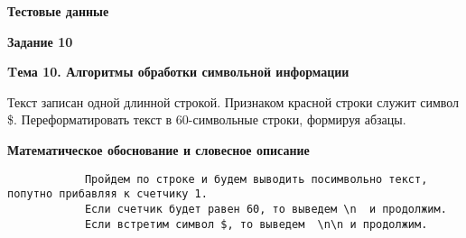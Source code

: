 \documentclass[12pt, a4paper]{article}
\begin{document}
		{\textbf{Тестовые данные}\par

		}


		\begin{flushleft}
			\newpage
			{\textbf{Задание 10}}\par
			{\textbf{Tема 10. Алгоритмы обработки символьной информации}}\par
			{Текст записан одной длинной строкой. Признаком красной строки
			служит символ \$. Переформатировать текст в 60-символьные строки,
			формируя абзацы.}\par
			{\textbf{Математическое обоснование и словесное описание}\par\begin{verbatim}
			Пройдем по строке и будем выводить посимвольно текст, попутно прибавляя к счетчику 1.
			Если счетчик будет равен 60, то выведем \n  и продолжим.
			Если встретим символ $, то выведем  \n\n и продолжим. \end{verbatim}
			}\par

		\end{flushleft}
		\newpage
\end{document}
